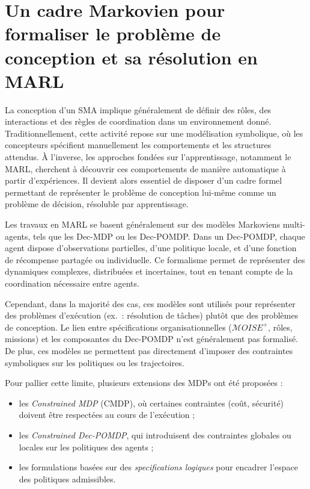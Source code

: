 \section{Un cadre Markovien pour formaliser le problème de conception et sa résolution en MARL}

\noindent
La conception d'un \ac{SMA} implique généralement de définir des rôles, des interactions et des règles de coordination dans un environnement donné. Traditionnellement, cette activité repose sur une modélisation symbolique, où les concepteurs spécifient manuellement les comportements et les structures attendus. À l'inverse, les approches fondées sur l'apprentissage, notamment le \ac{MARL}, cherchent à découvrir ces comportements de manière automatique à partir d'expériences. Il devient alors essentiel de disposer d'un cadre formel permettant de représenter le problème de conception lui-même comme un problème de décision, résoluble par apprentissage.

\medskip

\noindent
Les travaux en \ac{MARL} se basent généralement sur des modèles Markoviens multi-agents, tels que les \ac{Dec-MDP} ou les \ac{Dec-POMDP}. Dans un \ac{Dec-POMDP}, chaque agent dispose d'observations partielles, d'une politique locale, et d'une fonction de récompense partagée ou individuelle. Ce formalisme permet de représenter des dynamiques complexes, distribuées et incertaines, tout en tenant compte de la coordination nécessaire entre agents.

\noindent
Cependant, dans la majorité des cas, ces modèles sont utilisés pour représenter des problèmes d'exécution (ex.~: résolution de tâches) plutôt que des problèmes de conception. Le lien entre spécifications organisationnelles ($\mathcal{M}OISE^+$, rôles, missions) et les composantes du \ac{Dec-POMDP} n'est généralement pas formalisé. De plus, ces modèles ne permettent pas directement d'imposer des contraintes symboliques sur les politiques ou les trajectoires.

\medskip

\noindent
Pour pallier cette limite, plusieurs extensions des \ac{MDP}s ont été proposées :
\begin{itemize}
    \item les \textit{Constrained \ac{MDP}} (CMDP), où certaines contraintes (coût, sécurité) doivent être respectées au cours de l'exécution ;
    \item les \textit{Constrained \ac{Dec-POMDP}}, qui introduisent des contraintes globales ou locales sur les politiques des agents ;
    \item les formulations basées sur des \textit{specifications logiques} pour encadrer l'espace des politiques admissibles.
\end{itemize}

